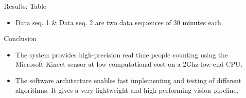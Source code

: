 \documentclass[final,hyperref={pdfpagelabels=false}]{beamer}
\begin{document}
\begin{frame}[t]
\begin{columns}[t]
\begin{column}{.465\textwidth}
\begin{block}{Results: Table}
\begin{itemize}
\item Data seq. 1 \& Data seq. 2 are two data sequences of 30 minutes each. 
\end{itemize}
     
\end{block}






\begin{block}{Conclusion}

\begin{itemize}
\item The system provides high-precision real time people counting using the Microsoft Kinect sensor at low computational cost on a 2Ghz low-end CPU.
\item The software architecture enables fast implementing and testing of different algorithms. It gives a very lightweight and high-performing vision pipeline. 
\end{itemize}
\vspace*{0.011\textheight} %
\end{block}

%
%        
%
%
%
%
%


\end{column}
\end{columns}
\end{frame}
\end{document}
